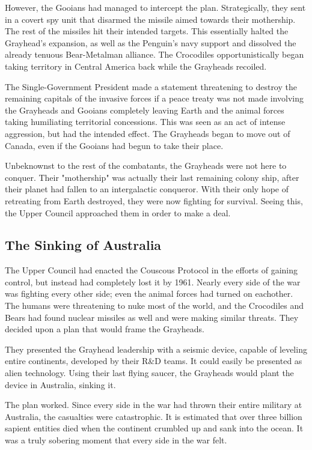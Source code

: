 \documentclass{article}
\begin{document}
However, the Gooians had managed to intercept the plan. Strategically, they sent in a covert spy unit that disarmed the missile aimed towards their mothership. The rest of the missiles hit their intended targets. This essentially halted the Grayhead's expansion, as well as the Penguin's navy support and dissolved the already tenuous Bear-Metalman alliance. The Crocodiles opportunistically began taking territory in Central America back while the Grayheads recoiled.

The Single-Government President made a statement threatening to destroy the remaining capitals of the invasive forces if a peace treaty was not made involving the Grayheads and Gooians completely leaving Earth and the animal forces taking humiliating territorial concessions. This was seen as an act of intense aggression, but had the intended effect. The Grayheads began to move out of Canada, even if the Gooians had begun to take their place.

Unbeknownst to the rest of the combatants, the Grayheads were not here to conquer. Their "mothership" was actually their last remaining colony ship, after their planet had fallen to an intergalactic conqueror. With their only hope of retreating from Earth destroyed, they were now fighting for survival. Seeing this, the Upper Council approached them in order to make a deal.

\subsection{The Sinking of Australia}

The Upper Council had enacted the Couscous Protocol in the efforts of gaining control, but instead had completely lost it by 1961. Nearly every side of the war was fighting every other side; even the animal forces had turned on eachother. The humans were threatening to nuke most of the world, and the Crocodiles and Bears had found nuclear missiles as well and were making similar threats. They decided upon a plan that would frame the Grayheads.

They presented the Grayhead leadership with a seismic device, capable of leveling entire continents, developed by their R\&D teams. It could easily be presented as alien technology. Using their last flying saucer, the Grayheads would plant the device in Australia, sinking it.

The plan worked. Since every side in the war had thrown their entire military at Australia, the casualties were catastrophic. It is estimated that over three billion sapient entities died when the continent crumbled up and sank into the ocean. It was a truly sobering moment that every side in the war felt.
\end{document}
